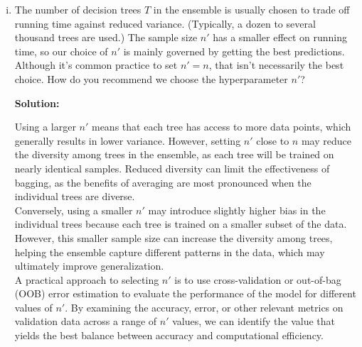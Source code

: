 \documentclass{article}
\newenvironment{solution}{\color{blue} \smallskip \textbf{Solution:}}{}
\begin{document}
\begin{enumerate}[(a)]
\begin{enumerate}[(i)]
\begin{solution}
\textbf{Step 2: Taking the Limit as \( n \to \infty \)}

As \( n \) becomes large, we can approximate \(\left(1 - \frac{1}{n}\right)^n\) using the limit:
\[
\lim_{n \to \infty} \left(1 - \frac{1}{n}\right)^n = e^{-1}.
\]

Since \( e^{-1} \approx 0.3679 \), we find that:
\[
\left(1 - \frac{1}{n}\right)^n \approx 0.37 \quad \text{for large } n.
\]


    	\end{solution}
     
    	\item 
        The number of decision trees $T$ in the ensemble is usually chosen to trade off running time against reduced variance. 
        (Typically, a dozen to several thousand trees are used.) 
        The sample size $n'$ has a smaller effect on running time, so our choice of $n'$ is mainly governed by getting the best predictions. 
        Although it's common practice to set $n' = n$, that isn't necessarily the best choice. 
        How do you recommend we choose the hyperparameter $n'$?
    	
    	\begin{solution}



Using a larger \( n' \) means that each tree has access to more data points, which generally results in lower variance. However, setting \( n' \) close to \( n \) may reduce the diversity among trees in the ensemble, as each tree will be trained on nearly identical samples. Reduced diversity can limit the effectiveness of bagging, as the benefits of averaging are most pronounced when the individual trees are diverse.\\

Conversely, using a smaller \( n' \) may introduce slightly higher bias in the individual trees because each tree is trained on a smaller subset of the data. However, this smaller sample size can increase the diversity among trees, helping the ensemble capture different patterns in the data, which may ultimately improve generalization.\\

A practical approach to selecting \( n' \) is to use cross-validation or out-of-bag (OOB) error estimation to evaluate the performance of the model for different values of \( n' \). By examining the accuracy, error, or other relevant metrics on validation data across a range of \( n' \) values, we can identify the value that yields the best balance between accuracy and computational efficiency.\\


\end{solution}
\end{enumerate}
\end{enumerate}
\end{document}
